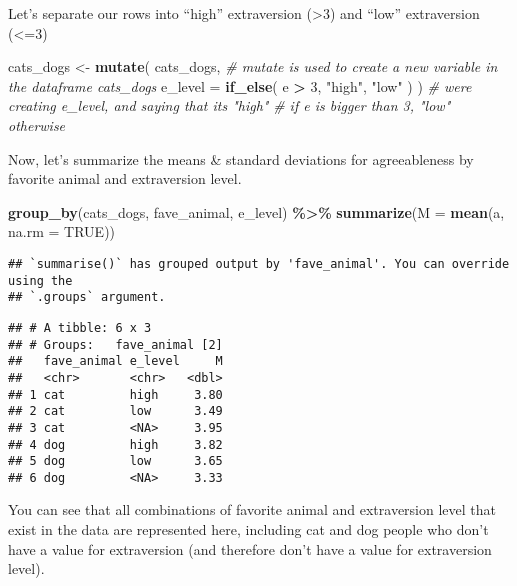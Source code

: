 \documentclass[
]{article}
\newenvironment{Shaded}{\begin{snugshade}}{\end{snugshade}}
\newcommand{\AttributeTok}[1]{\textcolor[rgb]{0.13,0.29,0.53}{#1}}
\newcommand{\CommentTok}[1]{\textcolor[rgb]{0.56,0.35,0.01}{\textit{#1}}}
\newcommand{\ConstantTok}[1]{\textcolor[rgb]{0.56,0.35,0.01}{#1}}
\newcommand{\DecValTok}[1]{\textcolor[rgb]{0.00,0.00,0.81}{#1}}
\newcommand{\FunctionTok}[1]{\textcolor[rgb]{0.13,0.29,0.53}{\textbf{#1}}}
\newcommand{\NormalTok}[1]{#1}
\newcommand{\OtherTok}[1]{\textcolor[rgb]{0.56,0.35,0.01}{#1}}
\newcommand{\SpecialCharTok}[1]{\textcolor[rgb]{0.81,0.36,0.00}{\textbf{#1}}}
\newcommand{\StringTok}[1]{\textcolor[rgb]{0.31,0.60,0.02}{#1}}
\begin{document}
Let's separate our rows into ``high'' extraversion (\textgreater3) and
``low'' extraversion (\textless=3)

\begin{Shaded}
\begin{Highlighting}[]
\NormalTok{cats\_dogs }\OtherTok{\textless{}{-}} \FunctionTok{mutate}\NormalTok{(}
\NormalTok{  cats\_dogs, }\CommentTok{\# mutate is used to create a new variable in the dataframe cats\_dogs}
  \AttributeTok{e\_level =} \FunctionTok{if\_else}\NormalTok{(}
\NormalTok{    e }\SpecialCharTok{\textgreater{}} \DecValTok{3}\NormalTok{, }\StringTok{"high"}\NormalTok{, }\StringTok{"low"}
\NormalTok{    )}
\NormalTok{  ) }\CommentTok{\# we\textquotesingle{}re creating e\_level, and saying that it\textquotesingle{}s "high" }
    \CommentTok{\# if e is bigger than 3, "low" otherwise}
\end{Highlighting}
\end{Shaded}

Now, let's summarize the means \& standard deviations for agreeableness
by favorite animal and extraversion level.

\begin{Shaded}
\begin{Highlighting}[]
\FunctionTok{group\_by}\NormalTok{(cats\_dogs, fave\_animal, e\_level) }\SpecialCharTok{\%\textgreater{}\%} 
  \FunctionTok{summarize}\NormalTok{(}\AttributeTok{M =} \FunctionTok{mean}\NormalTok{(a, }\AttributeTok{na.rm =} \ConstantTok{TRUE}\NormalTok{))}
\end{Highlighting}
\end{Shaded}

\begin{verbatim}
## `summarise()` has grouped output by 'fave_animal'. You can override using the
## `.groups` argument.
\end{verbatim}

\begin{verbatim}
## # A tibble: 6 x 3
## # Groups:   fave_animal [2]
##   fave_animal e_level     M
##   <chr>       <chr>   <dbl>
## 1 cat         high     3.80
## 2 cat         low      3.49
## 3 cat         <NA>     3.95
## 4 dog         high     3.82
## 5 dog         low      3.65
## 6 dog         <NA>     3.33
\end{verbatim}

You can see that all combinations of favorite animal and extraversion
level that exist in the data are represented here, including cat and dog
people who don't have a value for extraversion (and therefore don't have
a value for extraversion level).
\end{document}
